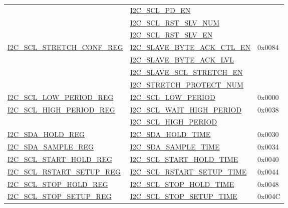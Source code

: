 \documentclass[main\_\_CN.tex]{subfiles}
\begin{document}
\begin{longtable}{ | p{6cm} | p{7cm} | p{2cm} | }
& {\hyperref[fielddesc:I2CSCLPDEN]{I2C\_SCL\_PD\_EN}}& \\\cline{2-2}
& {\hyperref[fielddesc:I2CSCLRSTSLVNUM]{I2C\_SCL\_RST\_SLV\_NUM}}& \\\cline{2-2}
& {\hyperref[fielddesc:I2CSCLRSTSLVEN]{I2C\_SCL\_RST\_SLV\_EN}}& \\ \hline
\hyperref[regdesc:I2CSCLSTRETCHCONFREG]{I2C\_SCL\_STRETCH\_CONF\_REG} & {\hyperref[fielddesc:I2CSLAVEBYTEACKCTLEN]{I2C\_SLAVE\_BYTE\_ACK\_CTL\_EN}} & 0x0084  \\\cline{2-2}
& {\hyperref[fielddesc:I2CSLAVEBYTEACKLVL]{I2C\_SLAVE\_BYTE\_ACK\_LVL}}& \\\cline{2-2}
& {\hyperref[fielddesc:I2CSLAVESCLSTRETCHEN]{I2C\_SLAVE\_SCL\_STRETCH\_EN}}& \\\cline{2-2}
& {\hyperref[fielddesc:I2CSTRETCHPROTECTNUM]{I2C\_STRETCH\_PROTECT\_NUM}}& \\ \hline
\hyperref[regdesc:I2CSCLLOWPERIODREG]{I2C\_SCL\_LOW\_PERIOD\_REG} & \hyperref[fielddesc:I2CSCLLOWPERIOD]{I2C\_SCL\_LOW\_PERIOD} & 0x0000  \\ \hline
\hyperref[regdesc:I2CSCLHIGHPERIODREG]{I2C\_SCL\_HIGH\_PERIOD\_REG} & \hyperref[fielddesc:I2CSCLWAITHIGHPERIOD]{I2C\_SCL\_WAIT\_HIGH\_PERIOD} & 0x0038  \\\cline{2-2}
& \hyperref[fielddesc:I2CSCLHIGHPERIOD]{I2C\_SCL\_HIGH\_PERIOD}& \\ \hline
\hyperref[regdesc:I2CSDAHOLDREG]{I2C\_SDA\_HOLD\_REG} & \hyperref[fielddesc:I2CSDAHOLDTIME]{I2C\_SDA\_HOLD\_TIME} & 0x0030  \\\hline
\hyperref[regdesc:I2CSDASAMPLEREG]{I2C\_SDA\_SAMPLE\_REG} & \hyperref[fielddesc:I2CSDASAMPLETIME]{I2C\_SDA\_SAMPLE\_TIME} & 0x0034  \\ \hline
\hyperref[regdesc:I2CSCLSTARTHOLDREG]{I2C\_SCL\_START\_HOLD\_REG} & \hyperref[fielddesc:I2CSCLSTARTHOLDTIME]{I2C\_SCL\_START\_HOLD\_TIME} & 0x0040  \\ \hline
\hyperref[regdesc:I2CSCLRSTARTSETUPREG]{I2C\_SCL\_RSTART\_SETUP\_REG} & \hyperref[fielddesc:I2CSCLRSTARTSETUPTIME]{I2C\_SCL\_RSTART\_SETUP\_TIME} & 0x0044  \\ \hline
\hyperref[regdesc:I2CSCLSTOPHOLDREG]{I2C\_SCL\_STOP\_HOLD\_REG} & \hyperref[fielddesc:I2CSCLSTOPHOLDTIME]{I2C\_SCL\_STOP\_HOLD\_TIME} & 0x0048  \\ \hline
\hyperref[regdesc:I2CSCLSTOPSETUPREG]{I2C\_SCL\_STOP\_SETUP\_REG} & \hyperref[fielddesc:I2CSCLSTOPSETUPTIME]{I2C\_SCL\_STOP\_SETUP\_TIME} & 0x004C  \\ \hline

\end{longtable}
\end{document}
